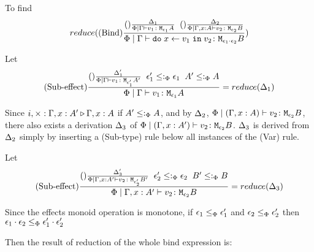 \documentclass{report}
\begin{document}
            To find
            \begin{equation}
                reduce(
                    (\text{Bind}) \frac{
                        (\text{}) \frac{
                            \Delta_1
                        }{
                            \Phi\mid\Gamma \vdash v_1 \colon \texttt{M}_{\epsilon_1}{A}
                        }
                        \;\;
                        (\text{}) \frac{
                            \Delta_2
                        }{
                            \Phi\mid\Gamma, x: A \vdash v_2 \colon \texttt{M}_{\epsilon_2}{B}
                        }
                    }{
                        \Phi\mid\Gamma \vdash \texttt{do}\; x \leftarrow v_1 \;\texttt{in}\; v_2 \colon \texttt{M}_{\epsilon_1\cdot\epsilon_2}{B}
                    }
                )
            \end{equation}


            Let \begin{equation}
                (\text{Sub-effect}) \frac{
                    (\text{}) \frac{\Delta'_1}{\Phi\mid\Gamma \vdash v_1 \colon \texttt{M}_{\epsilon'_1}{A'}}
                \;\;
                \epsilon_1' \leq:_\Phi \epsilon_1
                \;\;
                A' \leq:_\Phi A
                }{
                    \Phi\mid\Gamma \vdash v_1 \colon \texttt{M}_{\epsilon_1}{A}
                } = reduce(\Delta_1)
            \end{equation}

            Since $i,\times : \Gamma, x: A' \triangleright \Gamma, x: A$ if $A' \leq:_\Phi A$, and by $\Delta_2$, $\Phi\mid(\Gamma, x: A) \vdash v_2 \colon \texttt{M}_{\epsilon_2}{B}$, there also exists a derivation $\Delta_3$ of $\Phi\mid(\Gamma, x: A') \vdash v_2 \colon \texttt{M}_{\epsilon_2}{B}$. $\Delta_3$ is derived from $\Delta_2$ simply by inserting a (Sub-type) rule below all instances of the (Var) rule.

            Let \begin{equation}
                (\text{Sub-effect}) \frac{
                    (\text{}) \frac{\Delta'_3}{\Phi\mid\Gamma, x: A' \vdash v_2 \colon \texttt{M}_{\epsilon'_2}{B'}}
                \;\;
                \epsilon_2' \leq:_\Phi \epsilon_2
                \;\;
                B' \leq:_\Phi B
                }{
                    \Phi\mid\Gamma, x: A' \vdash v_2 \colon \texttt{M}_{\epsilon_2}{B}
                } = reduce(\Delta_3)
            \end{equation}
            

            Since the effects monoid operation is monotone, if $\epsilon_1\leq_{\Phi}\epsilon_1'$ and $\epsilon_2\leq_{\Phi}\epsilon_2'$ then $\epsilon_1\cdot\epsilon_2 \leq_{\Phi} \epsilon_1'\cdot\epsilon_2'$
            


            Then the result of reduction of the whole bind expression is:
\end{document}
